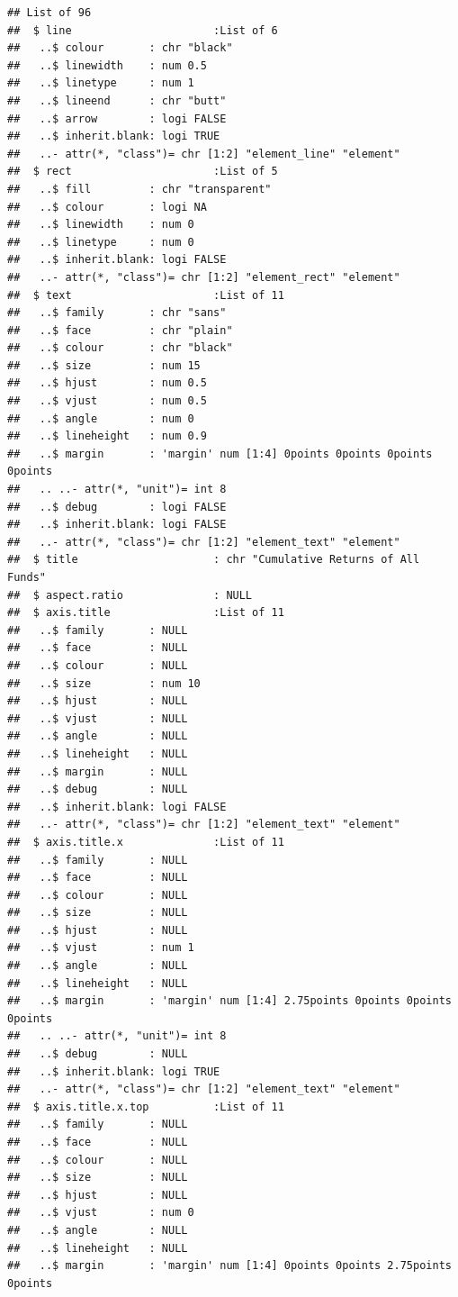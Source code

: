 \documentclass[12pt,preprint, authoryear]{elsarticle}
\numberwithin{equation}{section}
\numberwithin{figure}{section}
\numberwithin{table}{section}
\begin{document}
\begin{verbatim}
## List of 96
##  $ line                      :List of 6
##   ..$ colour       : chr "black"
##   ..$ linewidth    : num 0.5
##   ..$ linetype     : num 1
##   ..$ lineend      : chr "butt"
##   ..$ arrow        : logi FALSE
##   ..$ inherit.blank: logi TRUE
##   ..- attr(*, "class")= chr [1:2] "element_line" "element"
##  $ rect                      :List of 5
##   ..$ fill         : chr "transparent"
##   ..$ colour       : logi NA
##   ..$ linewidth    : num 0
##   ..$ linetype     : num 0
##   ..$ inherit.blank: logi FALSE
##   ..- attr(*, "class")= chr [1:2] "element_rect" "element"
##  $ text                      :List of 11
##   ..$ family       : chr "sans"
##   ..$ face         : chr "plain"
##   ..$ colour       : chr "black"
##   ..$ size         : num 15
##   ..$ hjust        : num 0.5
##   ..$ vjust        : num 0.5
##   ..$ angle        : num 0
##   ..$ lineheight   : num 0.9
##   ..$ margin       : 'margin' num [1:4] 0points 0points 0points 0points
##   .. ..- attr(*, "unit")= int 8
##   ..$ debug        : logi FALSE
##   ..$ inherit.blank: logi FALSE
##   ..- attr(*, "class")= chr [1:2] "element_text" "element"
##  $ title                     : chr "Cumulative Returns of All Funds"
##  $ aspect.ratio              : NULL
##  $ axis.title                :List of 11
##   ..$ family       : NULL
##   ..$ face         : NULL
##   ..$ colour       : NULL
##   ..$ size         : num 10
##   ..$ hjust        : NULL
##   ..$ vjust        : NULL
##   ..$ angle        : NULL
##   ..$ lineheight   : NULL
##   ..$ margin       : NULL
##   ..$ debug        : NULL
##   ..$ inherit.blank: logi FALSE
##   ..- attr(*, "class")= chr [1:2] "element_text" "element"
##  $ axis.title.x              :List of 11
##   ..$ family       : NULL
##   ..$ face         : NULL
##   ..$ colour       : NULL
##   ..$ size         : NULL
##   ..$ hjust        : NULL
##   ..$ vjust        : num 1
##   ..$ angle        : NULL
##   ..$ lineheight   : NULL
##   ..$ margin       : 'margin' num [1:4] 2.75points 0points 0points 0points
##   .. ..- attr(*, "unit")= int 8
##   ..$ debug        : NULL
##   ..$ inherit.blank: logi TRUE
##   ..- attr(*, "class")= chr [1:2] "element_text" "element"
##  $ axis.title.x.top          :List of 11
##   ..$ family       : NULL
##   ..$ face         : NULL
##   ..$ colour       : NULL
##   ..$ size         : NULL
##   ..$ hjust        : NULL
##   ..$ vjust        : num 0
##   ..$ angle        : NULL
##   ..$ lineheight   : NULL
##   ..$ margin       : 'margin' num [1:4] 0points 0points 2.75points 0points

\end{verbatim}
\end{document}
